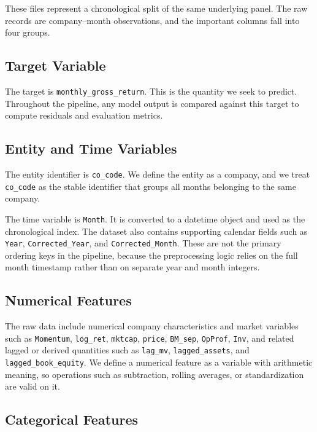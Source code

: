 \documentclass[11pt]{article}
\begin{document}
These files represent a chronological split of the same underlying panel. The raw records are company--month observations, and the important columns fall into four groups.

\subsection{Target Variable}

The target is \texttt{monthly\_gross\_return}. This is the quantity we seek to predict. Throughout the pipeline, any model output is compared against this target to compute residuals and evaluation metrics.

\subsection{Entity and Time Variables}

The entity identifier is \texttt{co\_code}. We define the entity as a company, and we treat \texttt{co\_code} as the stable identifier that groups all months belonging to the same company.

The time variable is \texttt{Month}. It is converted to a datetime object and used as the chronological index. The dataset also contains supporting calendar fields such as \texttt{Year}, \texttt{Corrected\_Year}, and \texttt{Corrected\_Month}. These are not the primary ordering keys in the pipeline, because the preprocessing logic relies on the full month timestamp rather than on separate year and month integers.

\subsection{Numerical Features}

The raw data include numerical company characteristics and market variables such as \texttt{Momentum}, \texttt{log\_ret}, \texttt{mktcap}, \texttt{price}, \texttt{BM\_sep}, \texttt{OpProf}, \texttt{Inv}, and related lagged or derived quantities such as \texttt{lag\_mv}, \texttt{lagged\_assets}, and \texttt{lagged\_book\_equity}. We define a numerical feature as a variable with arithmetic meaning, so operations such as subtraction, rolling averages, or standardization are valid on it.

\subsection{Categorical Features}
\end{document}
